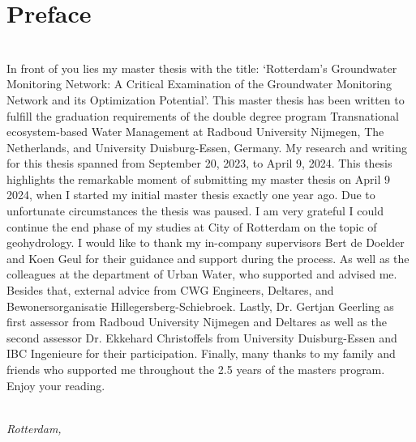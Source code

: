 \chapter*{Preface}

\emph{ }\\
In front of you lies my master thesis with the title: ‘Rotterdam’s Groundwater Monitoring Network: A Critical Examination of the Groundwater Monitoring Network and its Optimization Potential’. This master thesis has been written to fulfill the graduation requirements of the double degree program Transnational ecosystem-based Water Management at Radboud University Nijmegen, The Netherlands, and University Duisburg-Essen, Germany. My research and writing for this thesis spanned from September 20, 2023, to April 9, 2024.
\newline
\newline
This thesis highlights the remarkable moment of submitting my master thesis on April 9 2024, when I started my initial master thesis exactly one year ago. Due to unfortunate circumstances the thesis was paused. I am very grateful I could continue the end phase of my studies at City of Rotterdam on the topic of geohydrology.
\newline
\newline
I would like to thank my in-company supervisors Bert de Doelder and Koen Geul for their guidance and support during the process. As well as the colleagues at the department of Urban Water, who supported and advised me. Besides that, external advice from CWG Engineers, Deltares, and Bewonersorganisatie Hillegersberg-Schiebroek. Lastly, Dr. Gertjan Geerling as first assessor from Radboud University Nijmegen and Deltares as well as the second assessor Dr. Ekkehard Christoffels from University Duisburg-Essen and IBC Ingenieure for their participation.
\newline
\newline
Finally, many thanks to my family and friends who supported me throughout the 2.5 years of the masters program. 
\newline
\newline
Enjoy your reading.
\bigskip

\begin{flushright}
{\makeatletter\itshape
    \@author \\
    Rotterdam, \monthname{} \the\year{}
\makeatother}
\end{flushright}
